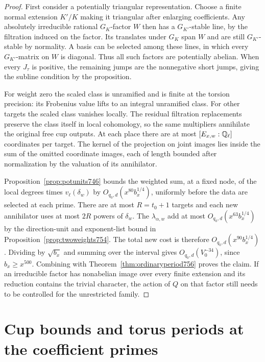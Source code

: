 \documentclass[a4paper,11pt]{article}
\theoremstyle{definition}
\theoremstyle{remark}
\numberwithin{equation}{section}
\begin{document}
\begin{proof}
First consider a potentially triangular representation. Choose
a finite normal extension \(K'/K\) making it triangular after
enlarging coefficients. Any absolutely irreducible rational
\(G_K\)-factor \(W\) then has a \(G_{K'}\)-stable line, by the
filtration induced on the factor. Its translates under \(G_K\)
span \(W\) and are still \(G_{K'}\)-stable by normality. A
basis can be selected among these lines, in which every
\(G_{K'}\)-matrix on \(W\) is diagonal. Thus all such factors
are potentially abelian. When every \(J_\tau\) is positive,
the remaining jumps are the nonnegative short jumps, giving
the subline condition by the proposition.

For weight zero the scaled class is unramified and is finite
at the torsion precision: its Frobenius value lifts to an
integral unramified class. For other targets the scaled class
vanishes locally. The residual filtration replacements preserve
the class itself in local cohomology, so the same multipliers
annihilate the original free cup outputs. At each place there
are at most \([E_{x,w}:\mathbb Q_\ell]\) coordinates per target.
The kernel of the projection on joint images lies inside the
sum of the omitted coordinate images, each of length bounded
after normalization by the valuation of its annihilator.

Proposition~\ref{prop:potunits746} bounds the weighted sum,
at a fixed node, of the local degrees times \(v_\ell(\delta_w)\)
by \(O_{q_0,d}(x^{80}b_x^{1/4})\), uniformly before the data
are selected at each prime. There are at most \(R=t_0+1\)
targets and each new annihilator uses at most \(2R\) powers
of \(\delta_w\). The \(\lambda_{\alpha,w}\) add at most
\(O_{q_0,d}(x^{63}b_x^{1/4})\) by the direction-unit and
exponent-list bound in Proposition~\ref{prop:twoweights754}.
The total new cost is therefore \(O_{q_0,d}(x^{90}b_x^{1/4})\).
Dividing by \(\sqrt{b_x}\) and summing over the interval gives
\(O_{q_0,d}(V_0^{-34})\), since \(b_x\ge x^{500}\).
Combining with Theorem~\ref{thm:ordinaryperiod756} proves the
claim. If an irreducible factor has nonabelian image over
every finite extension and its reduction contains the trivial
character, the action of \(Q\) on that factor still needs
to be controlled for the unrestricted family.
\end{proof}
\clearpage

\section{Cup bounds and torus periods at the coefficient primes}\label{nav:torus-primes}
\end{document}
